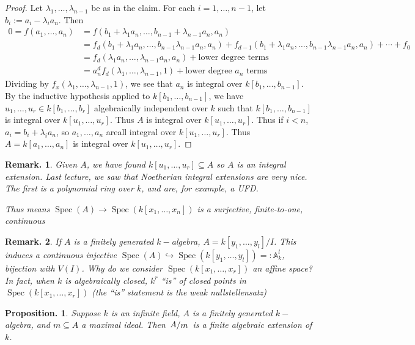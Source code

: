 \documentclass[11pt, a4paper]{memoir}
\newcommand{\hto}[0]{\ensuremath{\hookrightarrow}}
\theoremstyle{change}
\newtheorem{proposition}[theorem]{Proposition.}
\theoremstyle{plain}
\theoremstyle{nonumberplain}
\newtheorem{remark}{Remark.}
\newtheorem{proof}{Proof}
\DeclareMathOperator{\Spec}{Spec}
\newcommand{\quot}[2]{\mathchoice{\left.\raisebox{0.10em}{$#1$}\middle/\raisebox{-0.10em}{$#2$}\right.}
                                 {\left.\raisebox{0.04em}{$#1$}\middle/\raisebox{-0.04em}{$#2$}\right.}
                                 {\left.\raisebox{0.01em}{$#1$}\middle/\raisebox{-0.01em}{$#2$}\right.}
                                 {\left.\raisebox{0em}{$#1$}\middle/\raisebox{0em}{$#2$}\right.}}
\numberwithin{equation}{section}
\begin{document}
\begin{proof}
    Let $\lambda_1,\ldots,\lambda_{n-1}$ be as in the claim.
    For each $i=1,\ldots,n-1$, let $b_i:=a_i-\lambda_ia_n$.
    Then
    \begin{align*}
        0=f(a_1,\ldots,a_n) &= f(b_1+\lambda_1a_n,\ldots,b_{n-1}+\lambda_{n-1}a_n,a_n)\\
                            &= f_d(b_1+\lambda_1 a_n,\ldots,b_{n-1}\lambda_{n-1}a_n,a_n)+f_{d-1}(b_1+\lambda_1 a_n,\ldots,b_{n-1}\lambda_{n-1}a_n,a_n)+\cdots+f_0\\
                            &= f_d(\lambda_1a_n,\ldots,\lambda_{n-1}a_n,a_n)+\text{lower degree terms}\\
                            &= a_n^df_d(\lambda_1,\ldots,\lambda_{n-1},1)+\text{lower degree $a_n$ terms}
    \end{align*}
    Dividing by $f_x(\lambda_1,\ldots,\lambda_{n-1},1)$, we see that $a_n$ is integral over $k[b_1,\ldots,b_{n-1}]$.
    By the inductive hypothesis applied to $k[b_1,\ldots,b_{n-1}]$, we have $u_1,\ldots,u_r\in k[b_1,\ldots,b_r]$ algebraically independent over $k$ such that $k[b_1,\ldots,b_{n-1}]$ is integral over $k[u_1,\ldots,u_r]$.
    Thus $A$ is integral over $k[u_1,\ldots,u_r]$.
    Thus if $i<n$, $a_i=b_i+\lambda_ia_n$, so $a_1,\ldots,a_n$ areall integral over $k[u_1,\ldots,u_r]$.
    Thus $A=k[a_1,\ldots,a_n]$ is integral over $k[u_1,\ldots,u_r]$.
\end{proof}
\begin{remark}
    Given $A$, we have found $k[u_1,\ldots,u_r]\subseteq A$ so $A$ is an integral extension.
    Last lecture, we saw that Noetherian integral extensions are very nice.
    The first is a polynomial ring over $k$, and are, for example, a UFD.

    Thus means $\Spec(A)\to\Spec(k[x_1,\ldots,x_n])$ is a surjective, finite-to-one, continuous
\end{remark}
\begin{remark}
    If $A$ is a finitely generated $k-$algebra, $A=k[y_1,\ldots,y_l]/I$.
    This induces a continuous injective $\Spec(A)\hto\Spec(k[y_1,\ldots,y_l])=:\mathbb{A}_k^l$, bijection with $V(I)$.
    Why do we consider $\Spec(k[x_1,\ldots,x_r])$ an affine space?
    In fact, when $k$ is algebraically closed, $k^r$ ``is'' of closed points in $\Spec(k[x_1,\ldots,x_r])$ (the ``is'' statement is the weak nullstellensatz)
\end{remark}
\begin{proposition}
    Suppose $k$ is an infinite field, $A$ is a finitely generated $k-$algebra, and $m\subseteq A$ a maximal ideal.
    Then $\quot{A}{m}$ is a finite algebraic extension of $k$.
\end{proposition}
\end{document}

